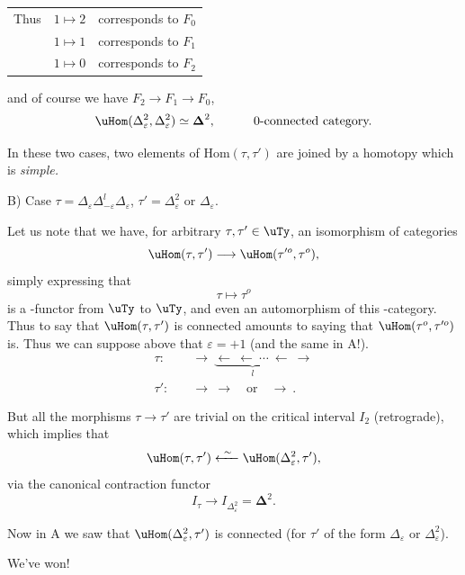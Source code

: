 
\begin{tabular}{lll}
Thus & $1\longmapsto 2$ & corresponds to \quad $F_0$\\[1ex]
 & $1\longmapsto 1$ & corresponds to \quad $F_1$\\[1ex]
 & $1\longmapsto 0$ & corresponds to \quad $F_2$
\end{tabular}

and of course we have $F_2\longrightarrow F_1\longrightarrow F_0$, %
\[
\uHom(\Delta^2_\varepsilon,\Delta^2_\varepsilon)\simeq\boldsymbol{\Delta}^2,\qquad\quad\text{0-connected category.}
\]

In these two cases, two elements of $\mathrm{Hom}(\tau,\tau')$ are joined by a homotopy which is \textit{simple.}


B) Case $\tau=\Delta_\varepsilon\Delta^l_{-\varepsilon}\Delta_\varepsilon$, $\tau'=\Delta^2_\varepsilon$ or $\Delta_\varepsilon$.

Let us note that we have, for arbitrary $\tau,\tau'\in\uTy$, an isomorphism of categories
\[
\uHom(\tau,\tau')\longrightarrow\uHom(\tau'^o,\tau^o),
\]
simply expressing that
\[
\tau\longmapsto\tau^o
\]
is a -functor from $\uTy$ to $\uTy$, and even an automorphism of this -category. Thus to say that $\uHom(\tau,\tau')$ is connected amounts to saying that $\uHom(\tau^o,\tau'^o)$ is. Thus we can suppose above that $\varepsilon=+1$ (and the same in A!).
\[
\begin{aligned}
\tau :\quad & \longrightarrow\ \underbrace{\longleftarrow\ \longleftarrow\ \cdots\ \longleftarrow}_{l}\ \longrightarrow\\
\tau' :\quad & \longrightarrow\ \longrightarrow\quad\text{or}\quad\longrightarrow\ .
\end{aligned}
\]

But all the morphisms $\tau\longrightarrow\tau'$ are trivial on the critical interval $I_2$ (retrograde), which implies that
\[
\uHom(\tau,\tau')\xleftarrow{\ \sim\ }\uHom(\Delta^2_\varepsilon,\tau'),
\]
via the canonical contraction functor
\[
I_\tau\longrightarrow I_{\Delta^2_\varepsilon}=\boldsymbol{\Delta}^2.
\]

Now in A we saw that $\uHom(\Delta^2_\varepsilon,\tau')$ is connected (for $\tau'$ of the form $\Delta_\varepsilon$ or $\Delta^2_\varepsilon$).

We've won!

\newpage
{}

